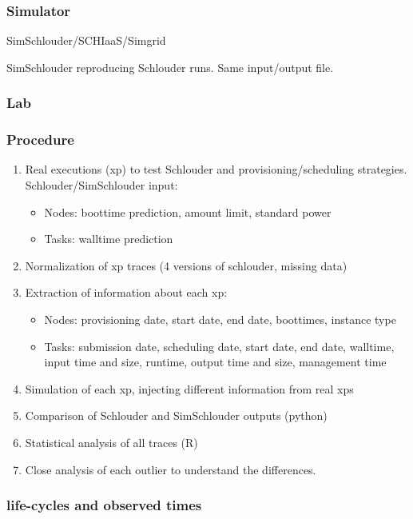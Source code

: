 \documentclass[a4paper,10pt]{article}
\begin{document}
\subsubsection{Simulator}

SimSchlouder/SCHIaaS/Simgrid

SimSchlouder reproducing Schlouder runs. Same input/output file.

\subsubsection{Lab}

\subsubsection{Procedure}

\begin{enumerate}
 \item Real executions (xp) to test Schlouder and provisioning/scheduling 
strategies.
  Schlouder/SimSchlouder input:
  \begin{itemize}
   \item Nodes: boottime prediction, amount limit, standard power
   \item Tasks: walltime prediction
  \end{itemize}
 
 \item Normalization of xp traces (4 versions of schlouder, missing data)
 \item Extraction of information about each xp:
  \begin{itemize}
   \item Nodes: provisioning date, start date, end date, boottimes, instance 
type
   \item Tasks: submission date, scheduling date, start date, end date, 
	  walltime, input time and size, runtime, output time and size, 
management time
  \end{itemize}
 \item Simulation of each xp, injecting different information from real xps
 \item Comparison of Schlouder and SimSchlouder outputs (python)
 \item Statistical analysis of all traces (R)
 \item Close analysis of each outlier to understand the differences. 
\end{enumerate}

\subsubsection{life-cycles and observed times}
\end{document}
